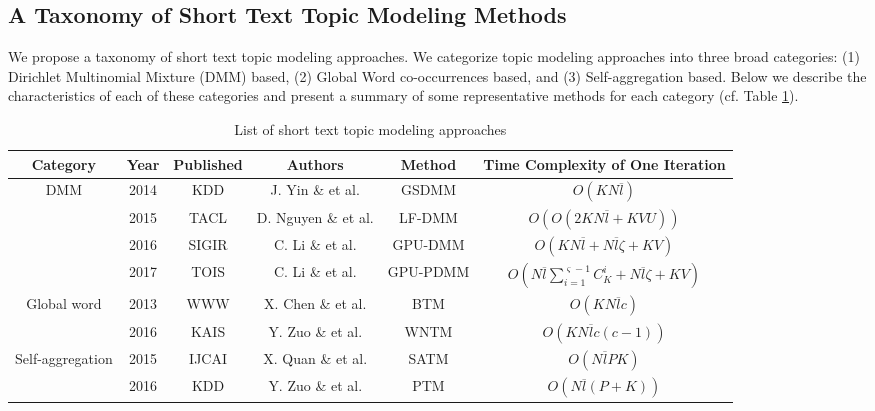 \documentclass[10pt,journal,compsoc]{IEEEtran}
\begin{document}
\subsection{A Taxonomy of Short Text Topic Modeling Methods}

We propose a taxonomy of short text topic modeling approaches. We categorize topic modeling approaches into three broad categories: (1) Dirichlet Multinomial Mixture (DMM) based, (2) Global Word co-occurrences based, and (3) Self-aggregation based. Below we describe the characteristics of each of these categories and present a summary of some representative methods for each category (cf. Table \ref{list}).

\begin{table}
\centering
\caption{List of short text topic modeling approaches }\label{list}
\begin{tabular}{|c|c|c|c|c|c|} \hline
   \textbf{Category} & \textbf{Year} & \textbf{Published} & \textbf{Authors} & \textbf{Method} & \textbf{Time Complexity of One Iteration}  \\\hline
   \multirow{3}{*}{DMM} & 2014 & KDD \cite{yin2014dirichlet} & J. Yin \& et al. & GSDMM & $O(KN\overline{l})$\\
                       & 2015 & TACL \cite{nguyen2015improving} & D. Nguyen \& et al. & LF-DMM & $O(O(2KN\overline{l}+KVU))$\\
                       & 2016 & SIGIR \cite{li2016topic}& C. Li \& et al. & GPU-DMM & $O(KN\overline{l}+N\overline{l}\zeta+KV)$\\
                       & 2017 & TOIS \cite{li2017enhancing} & C. Li \& et al. & GPU-PDMM & $O(N\overline{l}\sum_{i=1}^{\varsigma-1}C_K^i+N\overline{l}\zeta+KV)$\\ \hline
   \multirow{2}{*}{Global word} & 2013 & WWW \cite{cheng2014btm}  & X. Chen \& et al. & BTM & $O(KN\overline{l}c)$ \\
                                     co-occurrences & 2016 & KAIS \cite{zuo2016word}  & Y. Zuo \& et al. & WNTM & $O(KN\overline{l}c(c-1))$\\ \hline
    \multirow{2}{*}{ Self-aggregation} & 2015 & IJCAI & X. Quan \& et al. & SATM & $O(N\overline{l}PK)$\\
                                       & 2016 & KDD & Y. Zuo \& et al. & PTM & $O(N\overline{l}(P+K))$ \\ \hline

  \hline\end{tabular}

\end{table}
\end{document}
